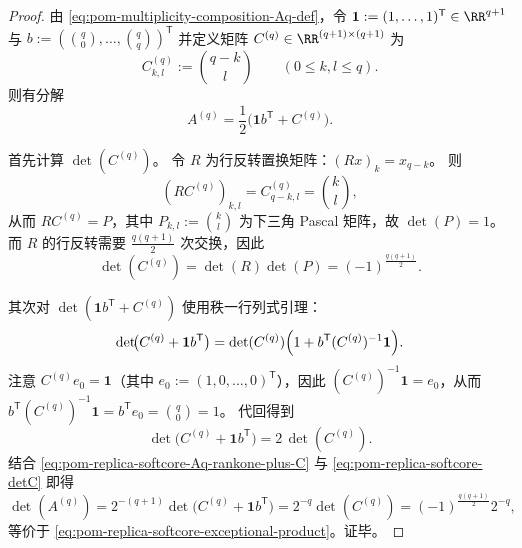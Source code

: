 \begin{proof}
由 \eqref{eq:pom-multiplicity-composition-Aq-def}，令
\(
\mathbf{1}:=(1,\dots,1)^{\mathsf T}\in\RR^{q+1}
\)
与
\(
b:=(\binom{q}{0},\dots,\binom{q}{q})^{\mathsf T}
\)
并定义矩阵 \(C^{(q)}\in\RR^{(q+1)\times(q+1)}\) 为
\[
C^{(q)}_{k,l}:=\binom{q-k}{l}\qquad(0\le k,l\le q).
\]
则有分解
\begin{equation}\label{eq:pom-replica-softcore-Aq-rankone-plus-C}
A^{(q)}=\frac12\bigl(\mathbf{1}b^{\mathsf T}+C^{(q)}\bigr).
\end{equation}
\par
首先计算 \(\det(C^{(q)})\)。
令 \(R\) 为行反转置换矩阵：\((Rx)_k=x_{q-k}\)。
则
\[
(RC^{(q)})_{k,l}=C^{(q)}_{q-k,l}=\binom{k}{l},
\]
从而 \(RC^{(q)}=P\)，其中 \(P_{k,l}:=\binom{k}{l}\) 为下三角 Pascal 矩阵，故 \(\det(P)=1\)。
而 \(R\) 的行反转需要 \(\frac{q(q+1)}{2}\) 次交换，因此
\begin{equation}\label{eq:pom-replica-softcore-detC}
\det(C^{(q)})=\det(R)\det(P)=(-1)^{\frac{q(q+1)}{2}}.
\end{equation}
\par
其次对 \(\det(\mathbf{1}b^{\mathsf T}+C^{(q)})\) 使用秩一行列式引理：
\[
\det\!\bigl(C^{(q)}+\mathbf{1}b^{\mathsf T}\bigr)=\det(C^{(q)})\Bigl(1+b^{\mathsf T}(C^{(q)})^{-1}\mathbf{1}\Bigr).
\]
注意 \(C^{(q)}e_0=\mathbf{1}\)（其中 \(e_0:=(1,0,\dots,0)^{\mathsf T}\)），因此 \((C^{(q)})^{-1}\mathbf{1}=e_0\)，从而
\(
b^{\mathsf T}(C^{(q)})^{-1}\mathbf{1}=b^{\mathsf T}e_0=\binom{q}{0}=1
\)。
代回得到
\[
\det\!\bigl(C^{(q)}+\mathbf{1}b^{\mathsf T}\bigr)=2\,\det(C^{(q)}).
\]
结合 \eqref{eq:pom-replica-softcore-Aq-rankone-plus-C} 与 \eqref{eq:pom-replica-softcore-detC} 即得
\[
\det(A^{(q)})
=2^{-(q+1)}\det\!\bigl(C^{(q)}+\mathbf{1}b^{\mathsf T}\bigr)
=2^{-q}\det(C^{(q)})
=(-1)^{\frac{q(q+1)}{2}}2^{-q},
\]
等价于 \eqref{eq:pom-replica-softcore-exceptional-product}。证毕。
\end{proof}

